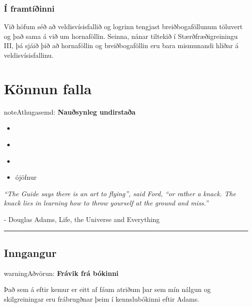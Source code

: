 \documentclass[a4paper,10pt,icelandic]{sphinxmanual}
\begin{document}
\subsection{Í framtíðinni}
\label{kafli04:i-framtiinni}
Við höfum séð að veldisvísisfallið og logrinn tengjast breiðbogaföllunum
töluvert og það sama á við um hornaföllin. Seinna, nánar tiltekið í
Stærðfræðigreiningu III, þá sjáið þið að hornaföllin og breiðbogaföllin
eru bara mismunandi hliðar á veldisvísisfallinu.



\chapter{Könnun falla}
\label{kafli05:konnun-falla}\label{kafli05::doc}
\begin{notice}{note}{Athugasemd:}
\textbf{Nauðsynleg undirstaða}
\begin{itemize}
\item {} 
{\hyperref[kafli03:vaxandiminnkandi]{}}

\item {} 
{\hyperref[kafli03:afleidur]{}}

\item {} 
{\hyperref[kafli03:utgildi]{}}

\item {} 
ójöfnur

\end{itemize}
\end{notice}

\emph{``The Guide says there is an art to flying'', said Ford, ``or rather a knack.
The knack lies in learning how to throw yourself at the ground and miss.''}

- Douglas Adams, Life, the Universe and Everything


\bigskip\hrule{}\bigskip



\section{Inngangur}
\label{kafli05:inngangur}
\begin{notice}{warning}{Aðvörun:}
\textbf{Frávik frá bókinni}

Það sem á eftir kemur er eitt af fáum atriðum þar sem mín nálgun og
skilgreiningar eru frábrugðnar þeim í kennslubókinni eftir Adams.
\end{notice}
\end{document}
